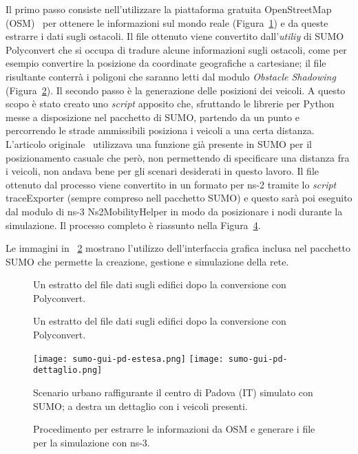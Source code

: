Il primo passo consiste nell'utilizzare la piattaforma gratuita OpenStreetMap (OSM)~\cite{osmWebsite} per
ottenere le informazioni sul mondo reale (Figura~\ref{fig:esempio-file-osm}) e da queste estrarre i dati sugli ostacoli.
Il file ottenuto viene convertito dall'\textit{utiliy} di SUMO Polyconvert che si occupa di tradure alcune informazioni
sugli ostacoli, come per esempio convertire la posizione da coordinate geografiche a cartesiane;
il file risultante conterrà i poligoni che saranno letti dal modulo \textit{Obstacle Shadowing} (Figura~\ref{fig:esempio-file-poly}).
Il secondo passo è la generazione delle posizioni dei veicoli.
A questo scopo è stato creato uno \textit{script} apposito che, sfruttando le librerie per Python messe a disposizione
nel pacchetto di SUMO, partendo da un punto e percorrendo le strade ammissibili posiziona i veicoli a una certa distanza.
L'articolo originale~\cite{Carpenter:2015:OMI:2756509.2756512} utilizzava una funzione già presente in SUMO
per il posizionamento casuale che però, non permettendo di specificare una distanza fra i veicoli, non andava bene per gli scenari desiderati in questo lavoro.
%
Il file ottenuto dal processo viene convertito in un formato per ns-2 tramite lo \textit{script} traceExporter (sempre compreso nell pacchetto SUMO)
e questo sarà poi eseguito dal modulo di ns-3 \textsf{Ns2MobilityHelper} in modo da posizionare i nodi durante la simulazione.
Il processo completo è riassunto nella Figura~\ref{fig:generazione-file-sumo}.

Le immagini in \figurename~\ref{fig:esempio-file-poly} mostrano l'utilizzo dell'interfaccia grafica
inclusa nel pacchetto SUMO che permette la creazione, gestione e simulazione della rete.
%
\begin{figure}[htbp]
	\centering
\caption{Un estratto del file dati sugli edifici dopo la conversione con Polyconvert.\label{fig:esempio-file-osm}}
\end{figure}
%
%
\begin{figure}[htbp]
	\centering
\caption{Un estratto del file dati sugli edifici dopo la conversione con Polyconvert.\label{fig:esempio-file-poly}}
\end{figure}
%
\begin{figure}[htbp]
	\centering
		\texttt{[image: sumo-gui-pd-estesa.png]}
		\hfill
		\texttt{[image: sumo-gui-pd-dettaglio.png]}
\caption{Scenario urbano raffigurante il centro di Padova (IT) simulato con SUMO; a destra un dettaglio con i veicoli presenti.\label{fig:sumo-gui}}
\end{figure}
%
\begin{figure}[htbp]
	\centering
	{
		\setlength{\fboxsep}{0pt}	%
	}
\caption{Procedimento per estrarre le informazioni da OSM e generare i file per la simulazione con ns-3.\label{fig:generazione-file-sumo}}
\end{figure}
